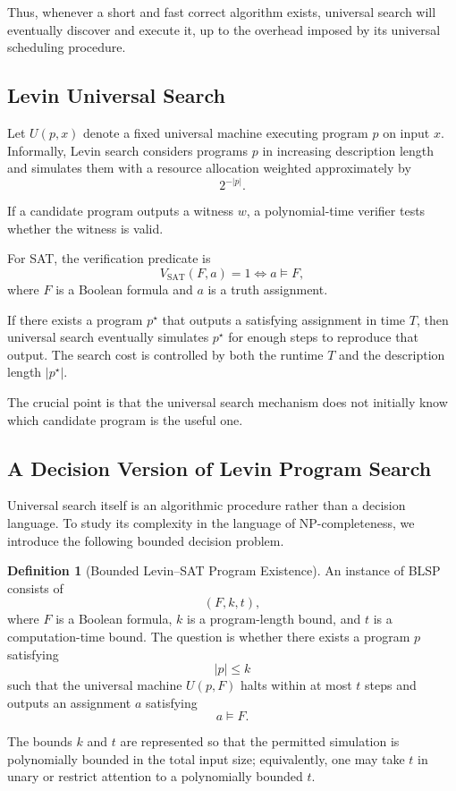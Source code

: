 \documentclass[11pt]{article}
\theoremstyle{plain}
\theoremstyle{definition}
\newtheorem{definition}[theorem]{Definition}
\begin{document}
Thus, whenever a short and fast correct algorithm exists, universal search
will eventually discover and execute it, up to the overhead imposed by its
universal scheduling procedure.

\subsection{Levin Universal Search}

Let \(U(p,x)\) denote a fixed universal machine executing program \(p\) on
input \(x\).  Informally, Levin search considers programs \(p\) in increasing
description length and simulates them with a resource allocation weighted
approximately by
\[
    2^{-|p|}.
\]

If a candidate program outputs a witness \(w\), a polynomial-time verifier
tests whether the witness is valid.

For SAT, the verification predicate is
\[
    V_{\mathrm{SAT}}(F,a)=1
    \iff
    a \models F,
\]
where \(F\) is a Boolean formula and \(a\) is a truth assignment.

If there exists a program \(p^\star\) that outputs a satisfying assignment in
time \(T\), then universal search eventually simulates \(p^\star\) for enough
steps to reproduce that output.  The search cost is controlled by both the
runtime \(T\) and the description length \(|p^\star|\).

The crucial point is that the universal search mechanism does not initially
know which candidate program is the useful one.

\subsection{A Decision Version of Levin Program Search}

Universal search itself is an algorithmic procedure rather than a decision
language.  To study its complexity in the language of NP-completeness, we
introduce the following bounded decision problem.

\begin{definition}[Bounded Levin--SAT Program Existence]
\label{def:bounded-levin-sat}
An instance of \textsc{BLSP} consists of
\[
    (F,k,t),
\]
where \(F\) is a Boolean formula, \(k\) is a program-length bound, and \(t\)
is a computation-time bound.  The question is whether there exists a program
\(p\) satisfying
\[
    |p|\leq k
\]
such that the universal machine \(U(p,F)\) halts within at most \(t\) steps
and outputs an assignment \(a\) satisfying
\[
    a\models F.
\]

The bounds \(k\) and \(t\) are represented so that the permitted simulation
is polynomially bounded in the total input size; equivalently, one may take
\(t\) in unary or restrict attention to a polynomially bounded \(t\).
\end{definition}
\end{document}
